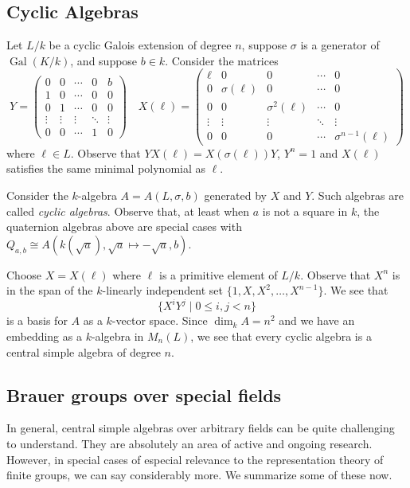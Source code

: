 \documentclass[12pt]{article}
\theoremstyle{plain}
\theoremstyle{definition}
\theoremstyle{remark}
\numberwithin{equation}{section}
\begin{document}
\subsection{Cyclic Algebras}

Let $L/k$ be a cyclic Galois extension of degree $n$,
suppose $\sigma$ is a generator of $\operatorname{Gal}(K/k)$,
and suppose $b \in k$.
Consider the matrices
\[
Y = \begin{pmatrix}
0 & 0 & \cdots & 0 & b\\
1 & 0 & \cdots & 0 & 0\\
0 & 1 & \cdots & 0 & 0\\
\vdots & \vdots & \vdots &\ddots & \vdots\\
0 & 0 & \cdots & 1 & 0
\end{pmatrix}
\quad
X(\ell) = \begin{pmatrix}
\ell & 0 & 0 &\cdots & 0\\
0 & \sigma(\ell) & 0 &\cdots & 0\\
0 & 0 & \sigma^2(\ell) &\cdots & 0\\
\vdots & \vdots & \vdots &\ddots & \vdots\\
0 & 0 & 0 &\cdots & \sigma^{n-1}(\ell)
\end{pmatrix}
\]
where $\ell \in L$.
Observe that $YX(\ell)=X(\sigma(\ell))Y$, $Y^n=1$
and $X(\ell)$ satisfies the same minimal polynomial as $\ell$.

Consider the $k$-algebra $A=A(L,\sigma,b)$ generated by $X$ and $Y$.
Such algebras are called \emph{cyclic algebras}.
Observe that, at least when $a$ is not a square in $k$,
the quaternion algebras above are special cases
with $Q_{a,b} \cong A(k(\sqrt{a}),\sqrt{a}\mapsto -\sqrt{a},b)$.

Choose $X=X(\ell)$ where $\ell$ is a primitive element of $L/k$.
Observe that $X^n$ is in the span of the $k$-linearly independent
set $\{1,X,X^2,\ldots,X^{n-1}\}$.
We see that
\[
\{ X^iY^j \mid 0 \le i,j < n \}
\]
is a basis for $A$ as a $k$-vector space.
Since $\dim_k A = n^2$ and we have an embedding as a $k$-algebra
in $M_n(L)$, we see that every cyclic algebra is a central simple
algebra of degree $n$.

\subsection{Brauer groups over special fields}

In general, central simple algebras over arbitrary fields can be quite
challenging to understand.  They are absolutely an area of active and
ongoing research.  However, in special cases of especial relevance to
the representation theory of finite groups, we can say considerably
more.  We summarize some of these now.
\end{document}
